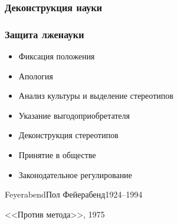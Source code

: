 \documentclass[aspectratio=169]{beamer}
\begin{document}
\begin{bframe}\frametitle{Деконструкция науки}


\begin{center}
\end{center}

\end{bframe}


\begin{bframe}\frametitle{Защита лженауки}

\begin{itemize}
\item<+-> Фиксация положения
\item<+-> Апология
\item<+-> Анализ культуры и выделение стереотипов
\item<+-> Указание выгодоприобретателя
\item<+-> Деконструкция стереотипов
\item<+-> Принятие в обществе
\item<+-> Законодательное регулирование
\end{itemize}
\end{bframe}


\begin{Person}{Feyerabend}{Пол Фейерабенд}{1924--1994}

{
<<Против метода>>, 1975
}

\end{Person}
\end{document}
